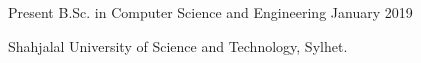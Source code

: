 %
%
%
\begin{scholarship}
   \scholarshipentry
    {Present}   {B.Sc. in Computer Science and Engineering}{}{}
    {January 2019} {
                       Shahjalal University of Science and Technology, Sylhet.
                                   
                      
                    }
                  
  \emptySeparator
 

\end{scholarship}

